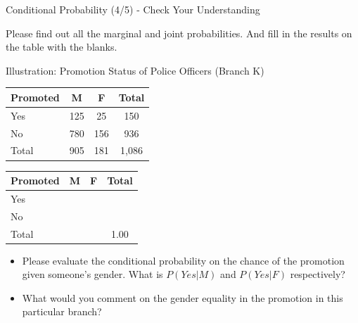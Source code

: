 \documentclass{beamer}
\begin{document}
\begin{frame}{Conditional Probability (4/5) - Check Your Understanding}

Please find out all the marginal and joint probabilities. And fill in the results on the table with the blanks.


\begin{center}
Illustration: Promotion Status of Police Officers (Branch K)
\end{center}

\begin{multicols}{2}

\begin{small}
\begin{center}
\begin{tabular}{l|c|c|c}
\hline 
Promoted & M & F & Total \\ 
\hline 
Yes & 125 & 25 & 150 \\ 
\hline 
No & 780 & 156 & 936 \\ 
\hline 
Total & 905 & 181 & 1,086 \\ 
\hline 
\end{tabular}
\end{center}

\begin{center}
\begin{tabular}{l|c|c|c}
\hline 
Promoted & M & F & Total \\ 
\hline 
Yes &  &  &  \\ 
\hline 
No &  & &  \\ 
\hline 
Total &  &  & 1.00 \\ 
\hline 
\end{tabular}
\end{center}
\end{small}
\end{multicols}

\begin{itemize}
\item Please evaluate the conditional probability on the chance of the promotion given someone's gender. What is $P(Yes | M) $ and $ P(Yes | F) $ respectively?
\item What would you comment on the gender equality in the promotion in this particular branch? 
\end{itemize}

\end{frame}
\end{document}

